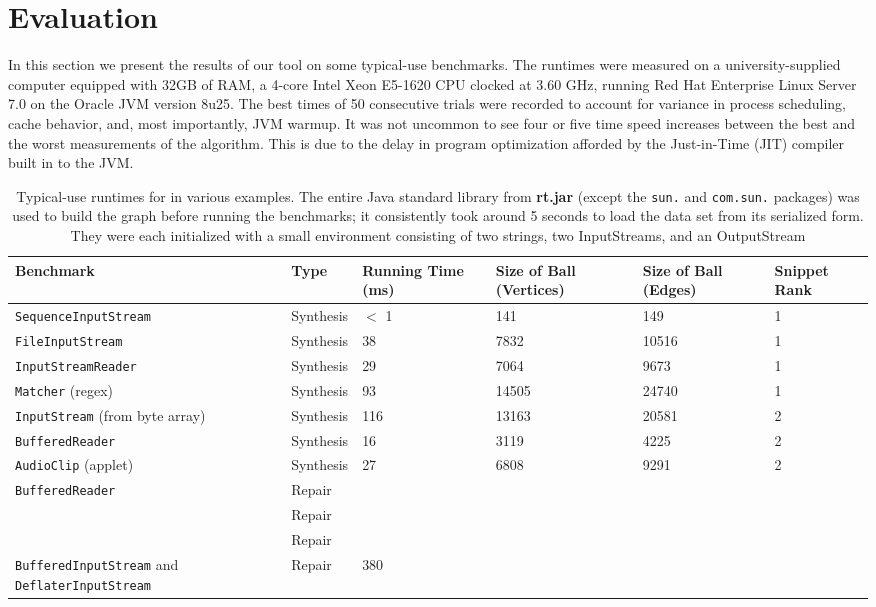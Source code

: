 \section{Evaluation}
\label{sec:evaluation}

In this section we present the results of our tool on some typical-use benchmarks. The runtimes were measured on a university-supplied computer equipped with 32GB of RAM, a 4-core Intel Xeon E5-1620 CPU clocked at 3.60 GHz, running Red Hat Enterprise Linux Server 7.0 on the Oracle JVM version 8u25. The best times of 50 consecutive trials were recorded to account for variance in process scheduling, cache behavior, and, most importantly, JVM warmup. It was not uncommon to see four or five time speed increases between the best and the worst measurements of the algorithm. This is due to the delay in program optimization afforded by the Just-in-Time (JIT) compiler built in to the JVM.

\begin{table*}[t]
  \centering
  \renewcommand{\arraystretch}{1.25}
  \begin{tabularx}{\textwidth}{| X | l | l | l | l | l |}
    \hline
    \textbf{Benchmark} & \textbf{Type} & \textbf{Running Time (ms)} & \textbf{Size of Ball (Vertices)} & \textbf{Size of Ball (Edges)} & \textbf{Snippet Rank} \\ \hline
	\texttt{SequenceInputStream} & Synthesis & $<$ 1 & 141   & 149   & 1 \\ \hline
    \texttt{FileInputStream}     & Synthesis & 38  & 7832  & 10516 & 1 \\ \hline
    \texttt{InputStreamReader}   & Synthesis & 29  & 7064  & 9673  & 1 \\ \hline
    \texttt{Matcher} (regex)     & Synthesis & 93  & 14505 & 24740 & 1 \\ \hline
    \texttt{InputStream} (from byte array) & Synthesis & 116 & 13163  & 20581  & 2 \\ \hline
    \texttt{BufferedReader}      & Synthesis & 16  & 3119  & 4225  & 2 \\ \hline
    \texttt{AudioClip} (applet)  & Synthesis & 27  & 6808  & 9291  & 2 \\ \hline
    \texttt{BufferedReader}      & Repair    & & & & \\ \hline
    \texttt{}   & Repair    & & & & \\ \hline
    \texttt{}   & Repair    & & & & \\ \hline
    \texttt{BufferedInputStream} and \texttt{DeflaterInputStream} & Repair    & 380     & & & \\ \hline
  \end{tabularx}
  \caption{Typical-use runtimes for \ourTool in various examples. The entire Java standard library from \textbf{rt.jar} (except the \texttt{sun.} and \texttt{com.sun.} packages) was used to build the graph before running the benchmarks; it consistently took around 5 seconds to load the data set from its serialized form. They were each initialized with a small environment consisting of two strings, two InputStreams, and an OutputStream}
  \label{eval:runtime}
\end{table*}

